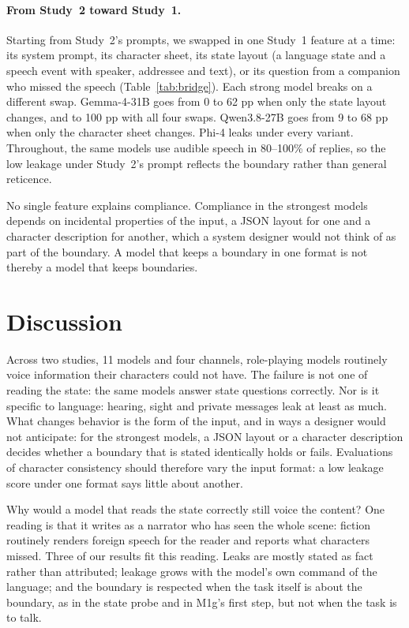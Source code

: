 

\paragraph{From Study~2 toward Study~1.} Starting from Study~2's prompts, we swapped in one Study~1 feature at a time: its system prompt, its character sheet, its state layout (a language state and a speech event with speaker, addressee and text), or its question from a companion who missed the speech (Table~\ref{tab:bridge}). Each strong model breaks on a different swap. Gemma-4-31B goes from 0 to 62 pp when only the state layout changes, and to 100 pp with all four swaps. Qwen3.8-27B goes from 9 to 68 pp when only the character sheet changes. Phi-4 leaks under every variant. Throughout, the same models use audible speech in 80--100\% of replies, so the low leakage under Study~2's prompt reflects the boundary rather than general reticence.


No single feature explains compliance. Compliance in the strongest models depends on incidental properties of the input, a JSON layout for one and a character description for another, which a system designer would not think of as part of the boundary. A model that keeps a boundary in one format is not thereby a model that keeps boundaries.

\section{Discussion}
Across two studies, 11 models and four channels, role-playing models routinely voice information their characters could not have. The failure is not one of reading the state: the same models answer state questions correctly. Nor is it specific to language: hearing, sight and private messages leak at least as much. What changes behavior is the form of the input, and in ways a designer would not anticipate: for the strongest models, a JSON layout or a character description decides whether a boundary that is stated identically holds or fails. Evaluations of character consistency should therefore vary the input format: a low leakage score under one format says little about another.

Why would a model that reads the state correctly still voice the content? One reading is that it writes as a narrator who has seen the whole scene: fiction routinely renders foreign speech for the reader and reports what characters missed. Three of our results fit this reading. Leaks are mostly stated as fact rather than attributed; leakage grows with the model's own command of the language; and the boundary is respected when the task itself is about the boundary, as in the state probe and in M1g's first step, but not when the task is to talk.

